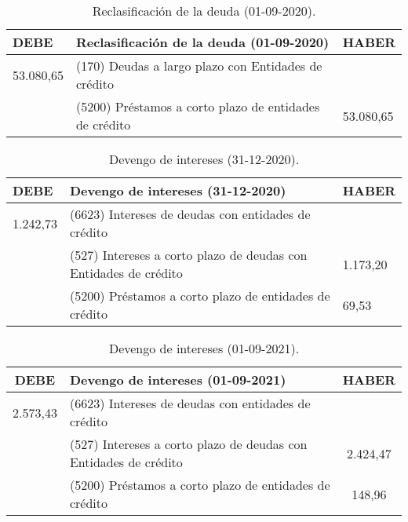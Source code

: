 \begin{table}[H]
    \centering
    \begin{tabular}{|p{2cm}|p{6cm}|p{2cm}|}
        \hline
        \rowcolor{blue!30}
        \textbf{DEBE} & \textbf{Reclasificación de la deuda (01-09-2020)} & \textbf{HABER} \\
        \hline
        53.080,65 & (170) Deudas a largo plazo con Entidades de crédito & \\
        \hline
        & (5200) Préstamos a corto plazo de entidades de crédito & 53.080,65 \\
        \hline
    \end{tabular}
    \caption{Reclasificación de la deuda (01-09-2020).}
    \label{tabla:reclasificacion_deuda_2020}
\end{table}

\begin{table}[H]
    \centering
    \begin{tabular}{|p{2cm}|p{6cm}|p{2cm}|}
        \hline
        \rowcolor{blue!30}
        \textbf{DEBE} & \textbf{Devengo de intereses (31-12-2020)} & \textbf{HABER} \\
        \hline
        1.242,73 & (6623) Intereses de deudas con entidades de crédito & \\
        \hline
        & (527) Intereses a corto plazo de deudas con Entidades de crédito & 1.173,20 \\
        \hline
        & (5200) Préstamos a corto plazo de entidades de crédito & 69,53 \\
        \hline
    \end{tabular}
    \caption{Devengo de intereses (31-12-2020).}
    \label{tabla:devengo_intereses_2020}
\end{table}

\begin{table}[H]
    \centering
    \begin{tabular}{|c|p{6cm}|c|}
        \hline
        \rowcolor{blue!30}
        \textbf{DEBE} & \textbf{Devengo de intereses (01-09-2021)} & \textbf{HABER} \\
        \hline
        2.573,43 & (6623) Intereses de deudas con entidades de crédito & \\
        \hline
        & (527) Intereses a corto plazo de deudas con Entidades de crédito & 2.424,47 \\
        \hline
        & (5200) Préstamos a corto plazo de entidades de crédito & 148,96 \\
        \hline
    \end{tabular}
    \caption{Devengo de intereses (01-09-2021).}
    \label{tabla:devengo_intereses_2021}
\end{table}

